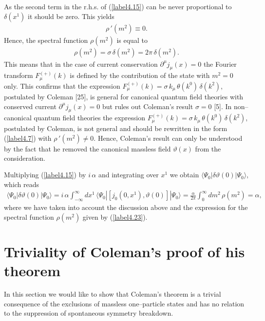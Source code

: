 \documentclass[a4paper,12pt] {article}
\begin{document}
As the second term in the r.h.s. of (\ref{label4.15}) can be never 
proportional to $\delta(x^1)$ it should be zero. This yields 
%
\begin{eqnarray}\label{label4.22}
\rho\,'(m^2) \equiv 0.
\end{eqnarray}
%
Hence, the spectral function $\rho(m^2)$ is equal to
%
\begin{eqnarray}\label{label4.23}
\rho(m^2) = \sigma\,\delta(m^2) = 2\pi\,\delta(m^2).
\end{eqnarray}
%
This means that in the case of current conservation
$\partial^{\mu}j_{\mu}(x) = 0$ the Fourier transform
$F^{(+)}_{\mu}(k)$ is defined by the contribution of the state with
$m^2 = 0$ only. This confirms that the expression $F^{(+)}_{\mu}(k) =
\sigma\,k_{\mu}\,\theta(k^0)\,\delta(k^2)$, postulated by Coleman
[25], is general for canonical quantum field theories with conserved
current $\partial^{\mu}j_{\mu}(x) = 0$ but rules out Coleman's result
$\sigma = 0$ [5]. In non--canonical quantum field theories the
expression $F^{(+)}_{\mu}(k) = \sigma\, k_{\mu}\, \theta(k^0)\,
\delta(k^2)$, postulated by Coleman, is not general and should be
rewritten in the form (\ref{label4.7}) with $\rho\,'(m^2) \neq
0$. Hence, Coleman's result can only be understood by the fact that he
removed the canonical massless field $\vartheta(x)$ from the
consideration.

Multiplying (\ref{label4.15}) by $i\,\alpha$ and integrating over
$x^1$ we obtain $\langle \Psi_0|\delta \vartheta(0)|\Psi_0 \rangle$,
which reads
%
\begin{eqnarray}\label{label4.24}
\langle \Psi_0|\delta \vartheta(0)|\Psi_0 \rangle =
i\,\alpha\int^{\infty}_{-\infty}dx^1\,\langle
\Psi_0|[j_0(0,x^1),\vartheta(0)]|\Psi_0\rangle = \frac{\alpha}{2\pi}
\int^{\infty}_0dm^2\,\rho(m^2) = \alpha,
\end{eqnarray}
%
where we have taken into account the discussion above and the
expression for the spectral function $\rho(m^2)$ given by
(\ref{label4.23}).


\section{Triviality of Coleman's proof of his theorem}
\setcounter{equation}{0}

\hspace{0.2in} In this section we would like to show that Coleman's
theorem is a trivial consequence of the exclusions of massless
one--particle states and has no relation to the suppression of
spontaneous symmetry breakdown. 
\end{document}
